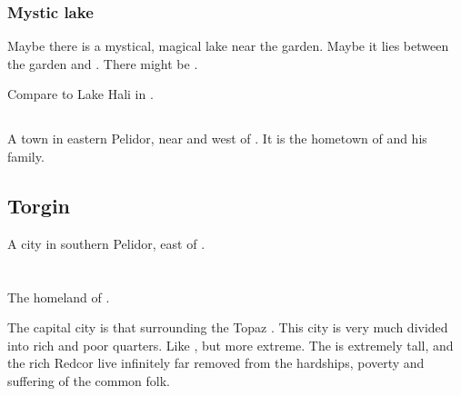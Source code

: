 \subsubsection{Mystic lake}
\label{Mystic lake in Malcur}
\label{Lake in Malcur}
Maybe there is a mystical, magical lake near the garden. Maybe it lies between the garden and \CastlePelidor. 
There might be .

Compare to Lake Hali in \RWCTKIY. 









\subsection{\Redglen}
\label{Redglen}
\index{\Redglen}
A town in eastern Pelidor, near  and west of . It is the hometown of  and his family. 









\subsection{Torgin}
\label{Torgin}
A city in southern Pelidor, east of \Redglen. 















\section{\Redce}
\label{Redce}
\index{\Redce}
The homeland of . 

The capital city is that surrounding the Topaz \Chateau. This city is very much divided into rich and poor quarters. Like , but more extreme. The \Chateau{} is extremely tall, and the rich Redcor live infinitely far removed from the hardships, poverty and suffering of the common folk. 









